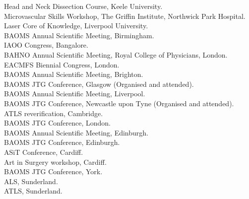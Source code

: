  Head and Neck Dissection Course, Keele University. \\
 Microvascular Skills Workshop, The Griffin Institute, Northwick Park Hospital. \\
 Laser Core of Knowledge, Liverpool University. \\
 BAOMS Annual Scientific Meeting, Birmingham. \\
 IAOO Congress, Bangalore. \\
 BAHNO Annual Scientific Meeting, Royal College of Physicians, London. \\
 EACMFS Biennial Congress, London. \\
 BAOMS Annual Scientific Meeting, Brighton. \\
 BAOMS JTG Conference, Glasgow (Organised and attended). \\
 BAOMS Annual Scientific Meeting, Liverpool. \\
 BAOMS JTG Conference, Newcastle upon Tyne (Organised and attended). \\
 ATLS reverification, Cambridge. \\
 BAOMS JTG Conference, London. \\
 BAOMS Annual Scientific Meeting, Edinburgh. \\
 BAOMS JTG Conference, Edinburgh. \\
 ASiT Conference, Cardiff. \\
 Art in Surgery workshop, Cardiff. \\
 BAOMS JTG Conference, York. \\
 ALS, Sunderland. \\
 ATLS, Sunderland. \\



